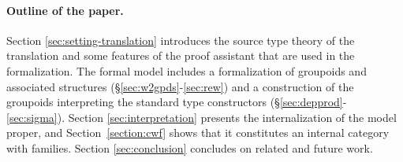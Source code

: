 


\paragraph{\bf Outline of the paper.}
Section \ref{sec:setting-translation} introduces the source type
theory of the translation and some features of the proof assistant
that are used in the formalization. The formal model includes a
formalization of groupoids and associated structures
(\S\ref{sec:w2gpds}-\ref{sec:rew}) and a construction of the groupoids
interpreting the standard type constructors
(\S\ref{sec:depprod}-\ref{sec:sigma}). Section
\ref{sec:interpretation} presents the internalization of the model
proper, and Section~\ref{section:cwf} shows that it constitutes an
internal category with families. 
% 
 Section \ref{sec:conclusion} concludes on related and future work.
%

